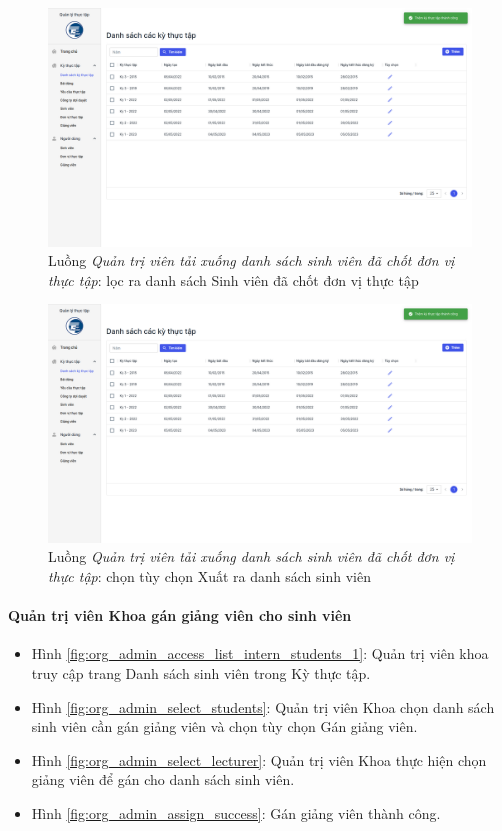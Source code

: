 \documentclass[./../main.tex]{subfiles}
\begin{document}
\begin{figure}[]
	\includegraphics[width=\linewidth]{./images/image55.png} %
	\caption{Luồng \emph{Quản trị viên tải xuống danh sách sinh viên đã chốt đơn vị thực tập}: lọc ra danh sách Sinh viên đã chốt đơn vị thực tập}
	\label{fig:org_admin_filter_students}
\end{figure}

\begin{figure}[]
	\includegraphics[width=\linewidth]{./images/image55.png} %
	\caption{Luồng \emph{Quản trị viên tải xuống danh sách sinh viên đã chốt đơn vị thực tập}: chọn tùy chọn Xuất ra danh sách sinh viên}
	\label{fig:org_admin_export}
\end{figure}

\paragraph*{Quản trị viên Khoa gán giảng viên cho sinh viên}

\begin{itemize}
	\item Hình \ref{fig:org_admin_access_list_intern_students_1}: Quản trị viên khoa truy cập trang Danh sách sinh viên trong Kỳ thực tập. 
	\item Hình \ref{fig:org_admin_select_students}: Quản trị viên Khoa chọn danh sách sinh viên cần gán giảng viên và chọn tùy chọn Gán giảng viên.
	\item Hình \ref{fig:org_admin_select_lecturer}: Quản trị viên Khoa thực hiện chọn giảng viên để gán cho danh sách sinh viên.
	\item Hình \ref{fig:org_admin_assign_success}: Gán giảng viên thành công.
\end{itemize}
\end{document}
